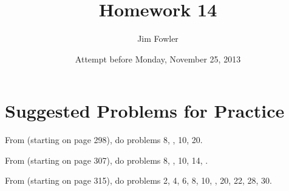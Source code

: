 \documentclass[12pt]{handout}
\title{Homework 14}
\date{Attempt before Monday, November 25, 2013}
\author{Jim Fowler}
\begin{document}
\maketitle











\section*{Suggested Problems for Practice}

From  (starting on page 298),
do problems 8, , 10, 20.
\vspace{1ex}

From  (starting on page 307),
do problems 8, , 10, 14, .
\vspace{1ex}

From  (starting on page 315),
do problems 2, 4, 6, 8, 10, , 20, 22, 28, 30.
\vspace{1ex}
\end{document}
